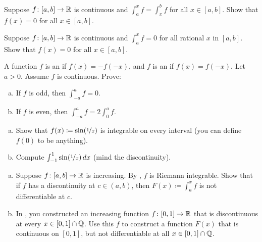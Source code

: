 \begin{exercise}
Suppose $f \colon [a,b] \to {\mathbb{R}}$ is continuous and
$\int_a^x f = \int_x^b f$ for all $x \in [a,b]$.  Show that $f(x) = 0$
for all $x \in [a,b]$.
\end{exercise}

\begin{exercise}
Suppose $f \colon [a,b] \to {\mathbb{R}}$ is continuous and
$\int_a^x f = 0$ for all rational $x$ in $[a,b]$.  Show that $f(x) = 0$
for all $x \in [a,b]$.
\end{exercise}

\begin{samepage}
\begin{exercise}
A function $f$ is an \emph{} if $f(x) = -f(-x)$,
and $f$ is an \emph{} if $f(x) = f(-x)$.  Let $a >
0$.  Assume $f$ is continuous.  Prove:
\begin{enumerate}[a)]
\item
If $f$ is odd, then $\int_{-a}^a f = 0$.
\item
If $f$ is even, then $\int_{-a}^a f = 2 \int_0^a f$.
\end{enumerate}
\end{exercise}
\end{samepage}

\begin{exercise}
\leavevmode
\begin{enumerate}[a)]
\item
Show that $f(x) \coloneqq \sin(\nicefrac{1}{x})$
is integrable on every interval (you can define $f(0)$ to be anything).
\item
Compute $\int_{-1}^1 \sin(\nicefrac{1}{x})\,dx$ (mind the
discontinuity).
\end{enumerate}
\end{exercise}

\begin{exercise}
\leavevmode
\begin{enumerate}[a)]
\item
Suppose $f \colon [a,b] \to {\mathbb{R}}$ is increasing.
By ,
$f$ is Riemann integrable.  Show that if $f$ has a discontinuity at $c \in
(a,b)$, then $F(x) \coloneqq \int_a^x f$ is not differentiable at $c$.
\item
In , you constructed an increasing
function $f \colon [0,1] \to {\mathbb{R}}$ that is discontinuous at every
$x \in [0,1] \cap {\mathbb{Q}}$.  Use this $f$ to construct a function $F(x)$ that is
continuous on $[0,1]$, but not differentiable at all $x \in [0,1] \cap {\mathbb{Q}}$.
\end{enumerate}
\end{exercise}

